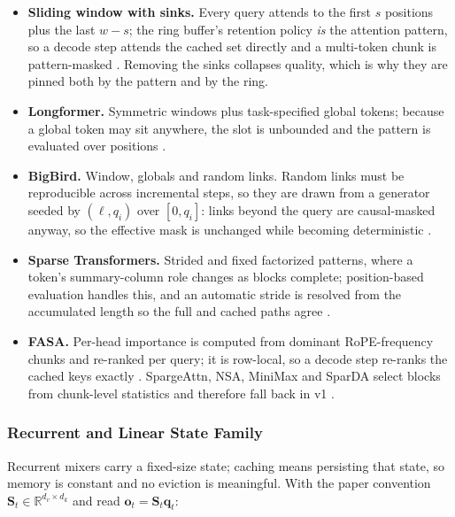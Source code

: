 \begin{itemize}[leftmargin=*]
    \item \textbf{Sliding window with sinks.} Every query attends to the first $s$ positions plus the last $w-s$; the ring buffer's retention policy \emph{is} the attention pattern, so a decode step attends the cached set directly and a multi-token chunk is pattern-masked \citep{jolicoeur_sliding_window_2026,xiao_streaming_sinks_2024}. Removing the sinks collapses quality, which is why they are pinned both by the pattern and by the ring.
    \item \textbf{Longformer.} Symmetric windows plus task-specified global tokens; because a global token may sit anywhere, the slot is unbounded and the pattern is evaluated over positions \citep{beltagy_longformer_2020}.
    \item \textbf{BigBird.} Window, globals and random links. Random links must be reproducible across incremental steps, so they are drawn from a generator seeded by $(\ell, q_i)$ over $[0, q_i]$: links beyond the query are causal-masked anyway, so the effective mask is unchanged while becoming deterministic \citep{zaheer_bigbird_2020}.
    \item \textbf{Sparse Transformers.} Strided and fixed factorized patterns, where a token's summary-column role changes as blocks complete; position-based evaluation handles this, and an automatic stride is resolved from the accumulated length so the full and cached paths agree \citep{child_sparse_transformer_2019}.
    \item \textbf{FASA.} Per-head importance is computed from dominant RoPE-frequency chunks and re-ranked per query; it is row-local, so a decode step re-ranks the cached keys exactly \citep{wang_fasa_2026}. SpargeAttn, NSA, MiniMax and SparDA select blocks from chunk-level statistics and therefore fall back in v1 \citep{zhang_spargeattn_2025,yuan_nsa_2025,lai_minimax_2026,fu_sparda_2026}.
\end{itemize}

\subsubsection{Recurrent and Linear State Family}

Recurrent mixers carry a fixed-size state; caching means persisting that state, so memory is constant and no eviction is meaningful. With the paper convention $\mathbf{S}_t \in \mathbb{R}^{d_v\times d_k}$ and read $\mathbf{o}_t = \mathbf{S}_t\mathbf{q}_t$:


